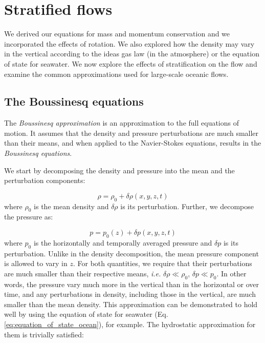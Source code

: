 \documentclass[12pt]{article}
\numberwithin{equation}{section}
\numberwithin{figure}{section}
\numberwithin{table}{section}
\begin{document}
\newpage
\section{Stratified flows}

We derived our equations for mass and momentum conservation and we incorporated
the effects of rotation.
We also explored how the density may vary in the vertical according to the
ideas gas law (in the atmosphere) or the equation of state for seawater.
We now explore the effects of stratification on the flow and examine the
common approximations used for large-scale oceanic flows.

\subsection{The Boussinesq equations}

The \textit{Boussinesq approximation} is an
approximation to the full equations of motion.
It assumes that the density and pressure perturbations are much smaller than
their means, and when applied to the Navier-Stokes equations, results in the
\textit{Boussinesq equations}.

We start by decomposing the density and pressure into the mean and the
perturbation components:

\begin{equation}
  \rho = \rho_0 + \delta \rho(x, y, z, t)
  \label{eq:boussinesq_density}
\end{equation}
where $\rho_0$ is the mean density and $\delta \rho$ is its perturbation.
Further, we decompose the pressure as:

\begin{equation}
  p = p_0(z) + \delta p(x, y, z, t)
  \label{eq:boussinesq_pressure}
\end{equation}
where $p_0$ is the horizontally and temporally averaged pressure and $\delta p$
is its perturbation.
Unlike in the density decomposition, the mean pressure component is allowed to
vary in $z$.
For both quantities, we require that their perturbations are much smaller
than their respective means, \textit{i.e.} $\delta \rho \ll \rho_0$, $\delta p \ll p_0$.
In other words, the pressure vary much more in the vertical than in the
horizontal or over time, and any perturbations in density, including those in
the vertical, are much smaller than the mean density.
This approximation can be demonstrated to hold well by using the equation of
state for seawater (Eq. \ref{eq:equation_of_state_ocean}), for example.
The hydrostatic approximation for them is trivially satisfied:
\end{document}

